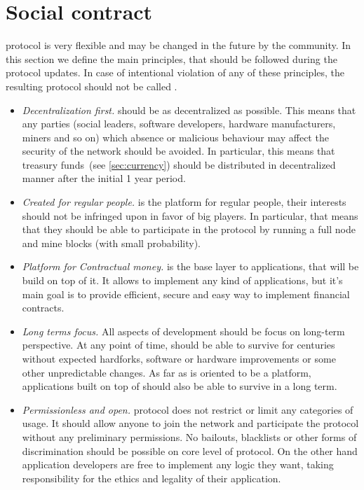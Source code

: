 \section{Social contract}
\label{sec:social}

\Ergo{} protocol is very flexible and may be changed in the future by the community.
In this section we define the main principles, that should be followed during the \Ergo{} protocol updates.
In case of intentional violation of any of these principles, the resulting protocol should not
be called \Ergo{}.

\begin{itemize}
    \item{\em Decentralization first.} \Ergo{} should be as decentralized as possible.
    This means that any parties (social leaders, software developers, hardware manufacturers, miners and so on)
    which absence or malicious behaviour may affect the security of the network should be avoided.
    In particular, this means that treasury funds~(see \ref{sec:currency}) should be distributed
    in decentralized manner after the initial 1 year period.
    \item{\em Created for regular people.} \Ergo{} is the platform for regular people, their interests should
    not be infringed upon in favor of big players. In particular, that means that they should be able to
    participate in the protocol by running a full node and mine blocks (with small probability).
    \item{\em Platform for Contractual money.} \Ergo{} is the base layer to applications, that will be
    build on top of it. It allows to implement any kind of applications, but it's main goal is
    to provide efficient, secure and easy way to implement financial contracts. 
    \item{\em Long terms focus.} All aspects of \Ergo{} development should be focus on long-term perspective.
    At any point of time, \Ergo{} should be able to survive for centuries without expected hardforks,
    software or hardware improvements or some other unpredictable changes. As far as \Ergo{} is oriented
    to be a platform, applications built on top of \Ergo{} should also be able to survive in a long term.
    \item{\em Permissionless and open.} \Ergo{} protocol does not restrict or limit any categories of usage.
    It should allow anyone to join the network and participate the protocol without any preliminary permissions.
    No bailouts, blacklists or other forms of discrimination should be possible on core level of \Ergo{} protocol.
    On the other hand application developers are free to implement any logic they want, taking responsibility
    for the ethics and legality of their application.
\end{itemize}